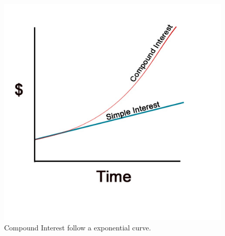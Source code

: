 \documentclass[
	11pt, %
]{beamer}
\begin{document}
\begin{frame}
\begin{columns}[t]
		\begin{column}{0.5\textwidth} %
			\begin{figure}
				\includegraphics[width=\linewidth]{Simple_Interest_Compound_Interest.jpeg}
				\caption{Compound Interest follow a exponential curve.}
			\end{figure}
    \end{column}
	\end{columns}
\end{frame}
\end{document}

